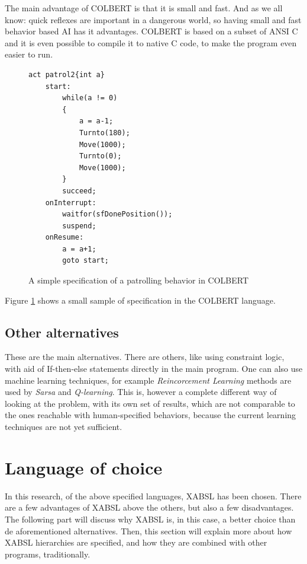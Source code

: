 \documentclass[a4paper,10pt]{article}
\begin{document}
The main advantage of COLBERT is that it is small and fast. And as we all know:
quick reflexes are important in a dangerous world, so having small and fast
behavior based AI has it advantages. COLBERT is based on a subset of ANSI C and
it is even possible to compile it to native C code, to make the program even
easier to run.

\begin{figure}
\centering
\begin{lstlisting}
act patrol2{int a}
    start: 
        while(a != 0)
        {
            a = a-1;
            Turnto(180);
            Move(1000);
            Turnto(0);
            Move(1000);
        }
        succeed;
    onInterrupt:
        waitfor(sfDonePosition());
        suspend;
    onResume:
        a = a+1;
        goto start;
\end{lstlisting}
    \caption{A simple specification of a patrolling behavior in COLBERT}
    \label{fig:colbert}
\end{figure}

Figure \ref{fig:colbert} shows a small sample of specification in the COLBERT
language. 

\subsection{Other alternatives}
These are the main alternatives. There are others, like using constraint logic,
with aid of If-then-else statements directly in the main program. One can also
use machine learning techniques, for example \textit{Reincorcement Learning}
methods are used by \textit{Sarsa} and \textit{Q-learning}. This is, however a
complete different way of looking at the problem, with its own set of results,
which are not comparable to the ones reachable with human-specified behaviors,
because the current learning techniques are not yet sufficient.

\section{Language of choice}
\label{sec:xabsl-focus}
In this research, of the above specified languages, XABSL has been chosen. There
are a few advantages of XABSL above the others, but also a few disadvantages.
The following part will discuss why XABSL is, in this case, a better choice than
de aforementioned alternatives. Then, this section will explain more about how
XABSL hierarchies are specified, and how they are combined with other programs,
traditionally.
\end{document}
